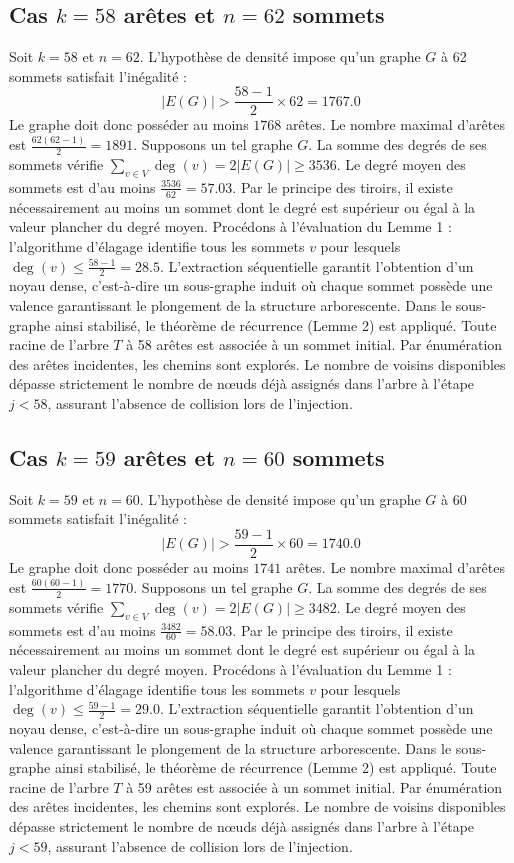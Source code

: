 \documentclass[12pt,a4paper]{article}
\begin{document}
\subsection{Cas $k = 58$ arêtes et $n = 62$ sommets}
Soit $k = 58$ et $n = 62$. L'hypothèse de densité impose qu'un graphe $G$ à 62 sommets satisfait l'inégalité :
$$ |E(G)| > \frac{58-1}{2} \times 62 = 1767.0 $$
Le graphe doit donc posséder au moins $1768$ arêtes. Le nombre maximal d'arêtes est $\frac{62(62-1)}{2} = 1891$.
Supposons un tel graphe $G$. La somme des degrés de ses sommets vérifie $\sum_{v \in V} \deg(v) = 2|E(G)| \geq 3536$.
Le degré moyen des sommets est d'au moins $\frac{3536}{62} = 57.03$.
Par le principe des tiroirs, il existe nécessairement au moins un sommet dont le degré est supérieur ou égal à la valeur plancher du degré moyen.
Procédons à l'évaluation du Lemme 1 : l'algorithme d'élagage identifie tous les sommets $v$ pour lesquels $\deg(v) \leq \frac{58-1}{2} = 28.5$.
L'extraction séquentielle garantit l'obtention d'un noyau dense, c'est-à-dire un sous-graphe induit où chaque sommet possède une valence garantissant le plongement de la structure arborescente.
Dans le sous-graphe ainsi stabilisé, le théorème de récurrence (Lemme 2) est appliqué. Toute racine de l'arbre $T$ à 58 arêtes est associée à un sommet initial. Par énumération des arêtes incidentes, les chemins sont explorés. Le nombre de voisins disponibles dépasse strictement le nombre de nœuds déjà assignés dans l'arbre à l'étape $j < 58$, assurant l'absence de collision lors de l'injection.

\subsection{Cas $k = 59$ arêtes et $n = 60$ sommets}
Soit $k = 59$ et $n = 60$. L'hypothèse de densité impose qu'un graphe $G$ à 60 sommets satisfait l'inégalité :
$$ |E(G)| > \frac{59-1}{2} \times 60 = 1740.0 $$
Le graphe doit donc posséder au moins $1741$ arêtes. Le nombre maximal d'arêtes est $\frac{60(60-1)}{2} = 1770$.
Supposons un tel graphe $G$. La somme des degrés de ses sommets vérifie $\sum_{v \in V} \deg(v) = 2|E(G)| \geq 3482$.
Le degré moyen des sommets est d'au moins $\frac{3482}{60} = 58.03$.
Par le principe des tiroirs, il existe nécessairement au moins un sommet dont le degré est supérieur ou égal à la valeur plancher du degré moyen.
Procédons à l'évaluation du Lemme 1 : l'algorithme d'élagage identifie tous les sommets $v$ pour lesquels $\deg(v) \leq \frac{59-1}{2} = 29.0$.
L'extraction séquentielle garantit l'obtention d'un noyau dense, c'est-à-dire un sous-graphe induit où chaque sommet possède une valence garantissant le plongement de la structure arborescente.
Dans le sous-graphe ainsi stabilisé, le théorème de récurrence (Lemme 2) est appliqué. Toute racine de l'arbre $T$ à 59 arêtes est associée à un sommet initial. Par énumération des arêtes incidentes, les chemins sont explorés. Le nombre de voisins disponibles dépasse strictement le nombre de nœuds déjà assignés dans l'arbre à l'étape $j < 59$, assurant l'absence de collision lors de l'injection.
\end{document}
